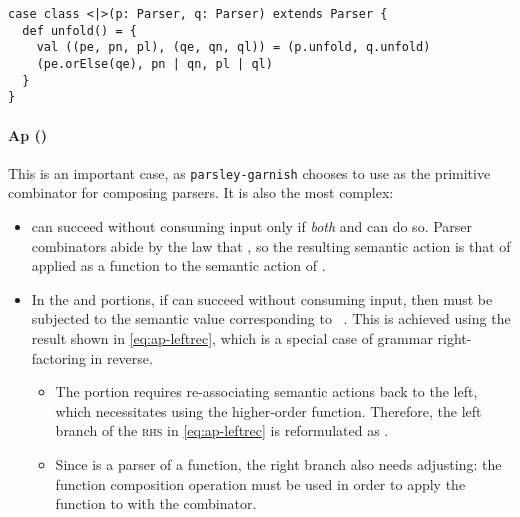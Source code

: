 \documentclass[../../main.tex]{subfiles}
\begin{document}
\begin{verbatim}
case class <|>(p: Parser, q: Parser) extends Parser {
  def unfold() = {
    val ((pe, pn, pl), (qe, qn, ql)) = (p.unfold, q.unfold)
    (pe.orElse(qe), pn | qn, pl | ql)
  }
}
\end{verbatim}

\paragraph{Ap (\scala{<*>})}
This is an important case, as \texttt{parsley-garnish} chooses to use \scala{<*>} as the primitive combinator for composing parsers.
It is also the most complex:
\begin{itemize}
  \item {} can succeed without consuming input only if \emph{both}  and  can do so. Parser combinators abide by the law that , so the resulting semantic action is that of  applied as a function to the semantic action of .
  \item In the  and  portions, if  can succeed without consuming input, then  must be subjected to the semantic value corresponding to ~\cite{swierstra_deterministic_1996}. This is achieved using the result shown in \cref{eq:ap-leftrec}, which is a special case of grammar right-factoring in reverse.
  \begin{itemize}
    \item The  portion requires re-associating semantic actions back to the left, which necessitates using the  higher-order function. Therefore, the left branch of the \textsc{rhs} in \cref{eq:ap-leftrec} is reformulated as .
    \item Since  is a parser of a function, the right branch also needs adjusting: the function composition operation must be used in order to apply the function to  with the \scala{<*>} combinator.
  \end{itemize}
\end{itemize}
\end{document}
